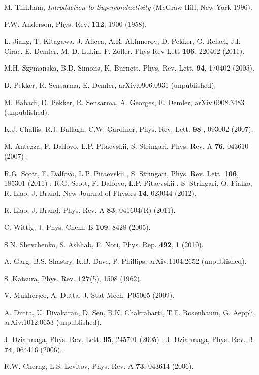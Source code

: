 \documentclass[aps,pra,floats,epsfig,pdflatex]{revtex4}                                                              %
\begin{document}
\begin{thebibliography}{}
M. Tinkham, \textit{Introduction to Superconductivity} (McGraw Hill, New York 1996).

P.W. Anderson, Phys. Rev. \textbf{112}, 1900 (1958).

L. Jiang, T. Kitagawa, J. Alicea, A.R. Akhmerov, D. Pekker, G. Refael, J.I. Cirac, E. Demler, M. D. Lukin, P. Zoller, Phys Rev Lett \textbf{106}, 220402 (2011).

M.H. Szymanska, B.D. Simons, K. Burnett, Phys. Rev. Lett. \textbf{94}, 170402 (2005).

D. Pekker, R. Sensarma, E. Demler,  arXiv:0906.0931 (unpublished).

M. Babadi, D. Pekker, R. Sensarma, A. Georges, E. Demler, arXiv:0908.3483 (unpublished).

K.J. Challis, R.J. Ballagh, C.W. Gardiner, Phys. Rev. Lett. \textbf{98} , 093002 (2007).

M. Antezza, F. Dalfovo, L.P. Pitaevskii, S. Stringari, Phys. Rev. A \textbf{76}, 043610 (2007) .

R.G. Scott, F. Dalfovo, L.P. Pitaevskii , S. Stringari, Phys. Rev. Lett. \textbf{106}, 185301 (2011) ;
R.G. Scott, F. Dalfovo, L.P. Pitaevskii , S. Stringari, O. Fialko, R. Liao, J. Brand, New Journal of Physics \textbf{14}, 023044 (2012).

R. Liao, J. Brand, Phys. Rev. A \textbf{83}, 041604(R) (2011).

C. Wittig, J. Phys. Chem. B \textbf{109}, 8428 (2005).

S.N. Shevchenko, S. Ashhab, F. Nori, Phys. Rep. \textbf{492}, 1 (2010).

A. Garg, B.S. Shastry, K.B. Dave, P. Phillips, arXiv:1104.2652 (unpublished).

S. Katsura, Phys. Rev. \textbf{127}(5), 1508 (1962).

V. Mukherjee, A. Dutta, J. Stat Mech, P05005 (2009).

A. Dutta, U. Divakaran, D. Sen, B.K. Chakrabarti, T.F. Rosenbaum, G. Aeppli, arXiv:1012:0653 (unpublished).

J. Dziarmaga, Phys. Rev. Lett. \textbf{95}, 245701 (2005) ; J. Dziarmaga, Phys. Rev. B \textbf{74}, 064416 (2006).

R.W. Cherng, L.S. Levitov, Phys. Rev. A \textbf{73}, 043614 (2006).


\end{thebibliography}
\end{document}
